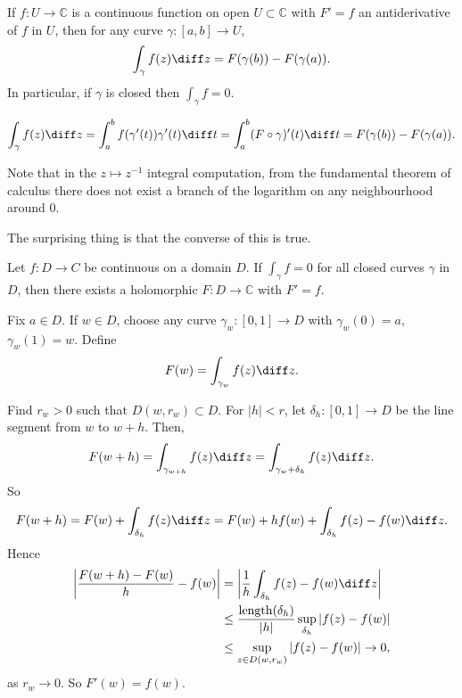 \documentclass[12pt]{article}
\begin{document}
\begin{theorem}
	If $f : U \to \mathbb{C}$ is a continuous function on open $U \subset \mathbb{C}$ with $F' = f$ an antiderivative of $f$ in $U$, then for any curve $\gamma : [a, b] \to U$,
	\[
	\int_{\gamma}f(z) \diff z = F(\gamma(b)) - F(\gamma(a))
	.\]
	In particular, if $\gamma$ is closed then $\int_{\gamma} f = 0$.
\end{theorem}

\begin{proofbox}
	\[
	\int_{\gamma}f(z) \diff z = \int_{a}^{b} f(\gamma'(t)) \gamma'(t) \diff t = \int_{a}^{b} (F \circ \gamma)'(t) \diff t = F(\gamma(b)) - F(\gamma(a))
	.\]
\end{proofbox}

Note that in the $z \mapsto z^{-1}$ integral computation, from the fundamental theorem of calculus there does not exist a branch of the logarithm on any neighbourhood around $0$.

The surprising thing is that the converse of this is true.

\begin{theorem}
	Let $f : D \to C$ be continuous on a domain $D$. If $\int_{\gamma}f = 0$ for all closed curves $\gamma$ in $D$, then there exists a holomorphic $F : D \to \mathbb{C}$ with $F' = f$.
\end{theorem}

\begin{proofbox}
	Fix $a \in D$. If $w \in D$, choose any curve $\gamma_w : [0,1] \to D$ with $\gamma_w(0) = a$, $\gamma_w(1) = w$. Define
	\[
	F(w) = \int_{\gamma_w}f(z) \diff z
	.\]

	Find $r_w > 0$ such that $D(w, r_w) \subset D$. For $|h| < r$, let $\delta_h : [0,1] \to D$ be the line segment from $w$ to $w+h$. Then,
	\[
	F(w+h) = \int_{\gamma_{w+h}}f(z) \diff z = \int_{\gamma_w + \delta_h} f(z) \diff z
	.\]
	So
	\[
		F(w+h) = F(w) + \int_{\delta_h}f(z) \diff z = F(w) + hf(w) + \int_{\delta_h}f(z) - f(w) \diff z
	.\]
	Hence
	\begin{align*}
		\biggl| \frac{F(w+h) - F(w)}{h} - f(w) \biggr| &= \biggl|\frac{1}{h} \int_{\delta_h} f(z) - f(w) \diff z \biggr| \\
							       &\leq \frac{\mathrm{length}(\delta_h)}{|h|} \sup_{\delta_h}|f(z) - f(w)| \\
							       &\leq \sup_{z \in D(w, r_w)} |f(z) - f(w)| \to 0,
	\end{align*}
	as $r_w \to 0$. So $F'(w) = f(w)$.
\end{proofbox}
\end{document}
